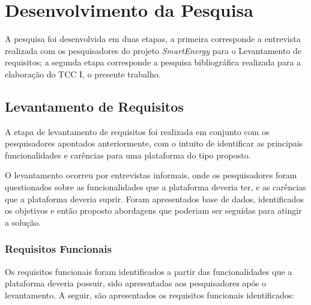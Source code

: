 
\chapter{Desenvolvimento da Pesquisa}
    \label{cha:desenvolvimento-da-pesquisa}

    A pesquisa foi desenvolvida em duas etapas, a primeira corresponde a entrevista realizada com os pesquisadores do projeto \textit{SmartEnergy} para o Levantamento de requisitos; a segunda etapa corresponde a pesquisa bibliográfica realizada para a elaboração do TCC I, o presente trabalho.

    \section{Levantamento de Requisitos}

    A etapa de levantamento de requisitos foi realizada em conjunto com os pesquisadores apontados anteriormente, com o intuito de identificar as principais funcionalidades e carências para uma plataforma do tipo proposto.

    O levantamento ocorreu por entrevistas informais, onde os pesquisadores foram questionados sobre as funcionalidades que a plataforma deveria ter, e as carências que a plataforma deveria suprir. Foram apresentados base de dados, identificados os objetivos e então proposto abordagens que poderiam ser seguidas para atingir a solução.

    \subsection{Requisitos Funcionais}

    Os requisitos funcionais foram identificados a partir das funcionalidades que a plataforma deveria possuir, sido apresentadas aos pesquisadores após o levantamento. A seguir, são apresentados os requisitos funcionais identificados:

